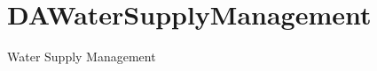 \chapter{DAWater\+Supply\+Management}
\hypertarget{index}{}\label{index}
\label{index_md__2_users_2antonioabilio_2_desktop_2proj-da-1_2_r_e_a_d_m_e}%
%
 Water Supply Management 